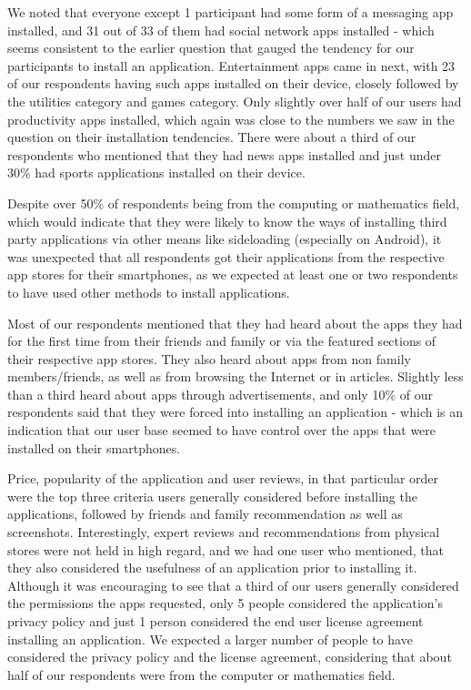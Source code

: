 \documentclass{sigchi}
\begin{document}
We noted that everyone except 1 participant had some form of a messaging app installed, and 31 out of 33 of them had social network apps installed - which seems consistent to the earlier question that gauged the tendency for our participants to install an application. Entertainment apps came in next, with 23 of our respondents having such apps installed on their device, closely followed by the utilities category and games category. Only slightly over half of our users had productivity apps installed, which again was close to the numbers we saw in the question on their installation tendencies. There were about a third of our respondents who mentioned that they had news apps installed and just under 30\% had sports applications installed on their device.

Despite over 50\% of respondents being from the computing or mathematics field, which would indicate that they were likely to know the ways of installing third party applications via other means like sideloading (especially on Android), it was unexpected that all respondents got their applications from the respective app stores for their smartphones, as we expected at least one or two respondents to have used other methods to install applications.

Most of our respondents mentioned that they had heard about the apps they had for the first time from their friends and family or via the featured sections of their respective app stores. They also heard about apps from non family members/friends, as well as from browsing the Internet or in articles. Slightly less than a third heard about apps through advertisements, and only 10\% of our respondents said that they were forced into installing an application - which is an indication that our user base seemed to have control over the apps that were installed on their smartphones.

Price, popularity of the application and user reviews, in that particular order were the top three criteria users generally considered before installing the applications, followed by friends and family recommendation as well as screenshots. Interestingly, expert reviews and recommendations from physical stores were not held in high regard, and we had one user who mentioned, that they also considered the usefulness of an application prior to installing it. Although it was encouraging to see that a third of our users generally considered the permissions the apps requested, only 5 people considered the application's privacy policy and just 1 person considered the end user license agreement installing an application. We expected a larger number of people to have considered the privacy policy and the license agreement, considering that about half of our respondents were from the computer or mathematics field.
\end{document}
